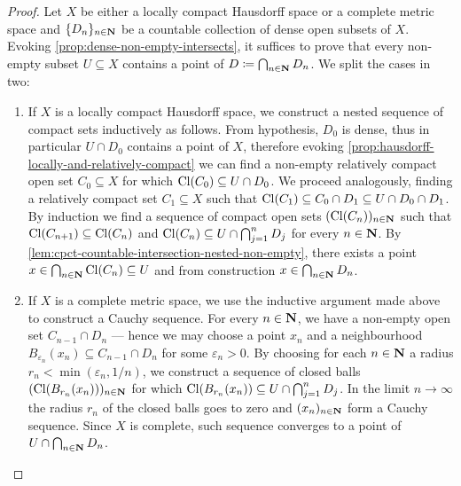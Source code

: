 \begin{proof}
Let \(X\) be either a locally compact Hausdorff space or a complete metric space
and \(\{D_n\}_{n \in \mathbf{N}}\) be a countable collection of dense open subsets of
\(X\). Evoking \cref{prop:dense-non-empty-intersects}, it suffices to prove that
every non-empty subset \(U \subseteq X\) contains a point of
\(D \coloneq \bigcap_{n \in \mathbf{N}} D_n\). We split the cases in two:
\begin{enumerate}\setlength\itemsep{0em}
\item If \(X\) is a locally compact Hausdorff space, we construct a nested
  sequence of compact sets inductively as follows. From hypothesis, \(D_0\) is
  dense, thus in particular \(U \cap D_0\) contains a point of \(X\), therefore
  evoking \cref{prop:hausdorff-locally-and-relatively-compact} we can find a
  non-empty relatively compact open set \(C_0 \subseteq X\) for which
  \(\operatorname{Cl}(C_0) \subseteq U \cap D_0\). We proceed analogously, finding a
  relatively compact set \(C_1 \subseteq X\) such that
  \(\operatorname{Cl}(C_1) \subseteq C_0 \cap D_1 \subseteq U \cap D_0 \cap D_1\). By
  induction we find a sequence of compact open sets \((\operatorname{Cl}(C_n))_{n \in \mathbf{N}}\)
  such that \(\operatorname{Cl}(C_{n+1}) \subseteq \operatorname{Cl}(C_{n})\) and
  \(\operatorname{Cl}(C_n) \subseteq U \cap \bigcap_{j=1}^n D_j\) for every \(n \in \mathbf{N}\). By
  \cref{lem:cpct-countable-intersection-nested-non-empty}, there exists a point
  \(x \in \bigcap_{n \in \mathbf{N}} \operatorname{Cl}(C_n) \subseteq U\) and from construction
  \(x \in \bigcap_{n \in \mathbf{N}} D_n\).

\item If \(X\) is a complete metric space, we use the inductive argument made
  above to construct a Cauchy sequence. For every \(n \in \mathbf{N}\), we have a
  non-empty open set \(C_{n-1} \cap D_n\) --- hence we may choose a point
  \(x_n\) and a neighbourhood
  \(B_{\varepsilon_n}(x_n) \subseteq C_{n-1} \cap D_n\) for some
  \(\varepsilon_n > 0\). By choosing for each \(n \in \mathbf{N}\) a radius
  \(r_n < \min(\varepsilon_n, 1/n)\), we construct a sequence of closed balls
  \((\operatorname{Cl}(B_{r_n}(x_n)))_{n \in \mathbf{N}}\) for which
  \(\operatorname{Cl}(B_{r_n}(x_n)) \subseteq U \cap \bigcap_{j=1}^n D_j\). In the limit
  \(n \to \infty\) the radius \(r_n\) of the closed balls goes to zero and
  \((x_n)_{n \in \mathbf{N}}\) form a Cauchy sequence. Since \(X\) is complete, such
  sequence converges to a point of \(U \cap \bigcap_{n \in \mathbf{N}} D_n\).
\end{enumerate}
\end{proof}

